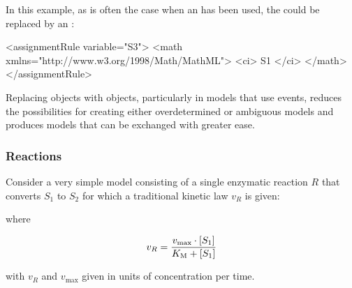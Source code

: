 In this example, as is often the case when an \AlgebraicRule has
been used, the \AlgebraicRule could be replaced by an
\AssignmentRule:

\begin{example}
<assignmentRule variable="S3">
    <math xmlns="http://www.w3.org/1998/Math/MathML">
       <ci> S1 </ci>
    </math>
</assignmentRule>
\end{example}

Replacing \AlgebraicRule objects with \AssignmentRule objects,
particularly in models that use events, reduces the possibilities
for creating either overdetermined or ambiguous models and
produces models that can be exchanged with greater ease.


\subsubsection{Reactions}
\label{sec:bp:reactions}


Consider a very simple model consisting of a single enzymatic reaction
$R$ that converts $S_{1}$ to $S_{2}$ for which a traditional kinetic
law $v_{R}$ is given:
\begin{center}
\end{center}
where
\begin{linenomath}
  \begin{equation*}
    v_{R} = \frac{v_\text{max} \cdot [S_{1}]}{K\sub{M} + [S_{1}]}
  \end{equation*}
\end{linenomath}

with $v_{R}$ and $v_\text{max}$ given in units of concentration
per time.

